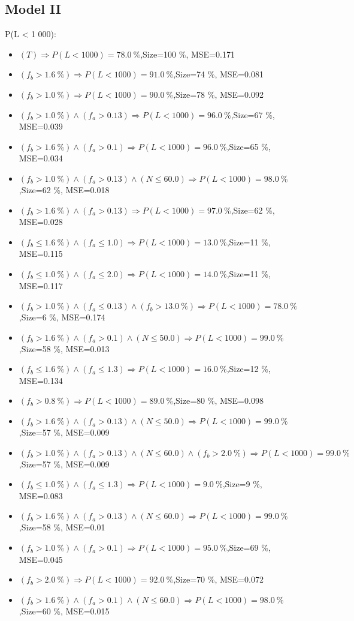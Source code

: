 \documentclass[numbered]{CSL}
\begin{document}
\subsection{Model II}
P(L < 1 000):
\begin{itemize}
\item $(T) \Rightarrow P(L < 1 000) = 78.0~\%$,\hfill Size=100 \%, MSE=0.171
\item $(f_b > 1.6~\%) \Rightarrow P(L < 1 000) = 91.0~\%$,\hfill Size=74 \%, MSE=0.081
\item $(f_b > 1.0~\%) \Rightarrow P(L < 1 000) = 90.0~\%$,\hfill Size=78 \%, MSE=0.092
\item $(f_b > 1.0~\%) \land (f_a > 0.13) \Rightarrow P(L < 1 000) = 96.0~\%$,\hfill Size=67 \%, MSE=0.039
\item $(f_b > 1.6~\%) \land (f_a > 0.1) \Rightarrow P(L < 1 000) = 96.0~\%$,\hfill Size=65 \%, MSE=0.034
\item $(f_b > 1.0~\%) \land (f_a > 0.13) \land (N \leq 60.0) \Rightarrow P(L < 1 000) = 98.0~\%$,\hfill Size=62 \%, MSE=0.018
\item $(f_b > 1.6~\%) \land (f_a > 0.13) \Rightarrow P(L < 1 000) = 97.0~\%$,\hfill Size=62 \%, MSE=0.028
\item $(f_b \leq 1.6~\%) \land (f_a \leq 1.0) \Rightarrow P(L < 1 000) = 13.0~\%$,\hfill Size=11 \%, MSE=0.115
\item $(f_b \leq 1.0~\%) \land (f_a \leq 2.0) \Rightarrow P(L < 1 000) = 14.0~\%$,\hfill Size=11 \%, MSE=0.117
\item $(f_b > 1.0~\%) \land (f_a \leq 0.13) \land (f_b > 13.0~\%) \Rightarrow P(L < 1 000) = 78.0~\%$,\hfill Size=6 \%, MSE=0.174
\item $(f_b > 1.6~\%) \land (f_a > 0.1) \land (N \leq 50.0) \Rightarrow P(L < 1 000) = 99.0~\%$,\hfill Size=58 \%, MSE=0.013
\item $(f_b \leq 1.6~\%) \land (f_a \leq 1.3) \Rightarrow P(L < 1 000) = 16.0~\%$,\hfill Size=12 \%, MSE=0.134
\item $(f_b > 0.8~\%) \Rightarrow P(L < 1 000) = 89.0~\%$,\hfill Size=80 \%, MSE=0.098
\item $(f_b > 1.6~\%) \land (f_a > 0.13) \land (N \leq 50.0) \Rightarrow P(L < 1 000) = 99.0~\%$,\hfill Size=57 \%, MSE=0.009
\item $(f_b > 1.0~\%) \land (f_a > 0.13) \land (N \leq 60.0) \land (f_b > 2.0~\%) \Rightarrow P(L < 1 000) = 99.0~\%$,\hfill Size=57 \%, MSE=0.009
\item $(f_b \leq 1.0~\%) \land (f_a \leq 1.3) \Rightarrow P(L < 1 000) = 9.0~\%$,\hfill Size=9 \%, MSE=0.083
\item $(f_b > 1.6~\%) \land (f_a > 0.13) \land (N \leq 60.0) \Rightarrow P(L < 1 000) = 99.0~\%$,\hfill Size=58 \%, MSE=0.01
\item $(f_b > 1.0~\%) \land (f_a > 0.1) \Rightarrow P(L < 1 000) = 95.0~\%$,\hfill Size=69 \%, MSE=0.045
\item $(f_b > 2.0~\%) \Rightarrow P(L < 1 000) = 92.0~\%$,\hfill Size=70 \%, MSE=0.072
\item $(f_b > 1.6~\%) \land (f_a > 0.1) \land (N \leq 60.0) \Rightarrow P(L < 1 000) = 98.0~\%$,\hfill Size=60 \%, MSE=0.015
\end{itemize}
\end{document}
